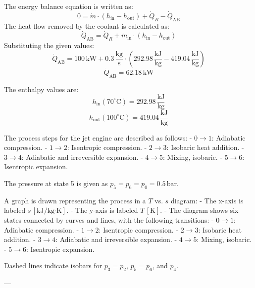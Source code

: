The energy balance equation is written as:  
\[
0 = \dot{m} \cdot (h_{\text{in}} - h_{\text{out}}) + \dot{Q}_R - \dot{Q}_{\text{AB}}
\]  
The heat flow removed by the coolant is calculated as:  
\[
\dot{Q}_{\text{AB}} = \dot{Q}_R + \dot{m}_{\text{in}} \cdot (h_{\text{in}} - h_{\text{out}})
\]  
Substituting the given values:  
\[
\dot{Q}_{\text{AB}} = 100 \, \text{kW} + 0.3 \, \frac{\text{kg}}{\text{s}} \cdot (292.98 \, \frac{\text{kJ}}{\text{kg}} - 419.04 \, \frac{\text{kJ}}{\text{kg}})
\]  
\[
\dot{Q}_{\text{AB}} = 62.18 \, \text{kW}
\]  

The enthalpy values are:  
\[
h_{\text{in}}(70^\circ\text{C}) = 292.98 \, \frac{\text{kJ}}{\text{kg}}
\]  
\[
h_{\text{out}}(100^\circ\text{C}) = 419.04 \, \frac{\text{kJ}}{\text{kg}}
\]

The process steps for the jet engine are described as follows:  
- \( 0 \rightarrow 1 \): Adiabatic compression.  
- \( 1 \rightarrow 2 \): Isentropic compression.  
- \( 2 \rightarrow 3 \): Isobaric heat addition.  
- \( 3 \rightarrow 4 \): Adiabatic and irreversible expansion.  
- \( 4 \rightarrow 5 \): Mixing, isobaric.  
- \( 5 \rightarrow 6 \): Isentropic expansion.  

The pressure at state 5 is given as \( p_5 = p_6 = p_0 = 0.5 \, \text{bar} \).  

A graph is drawn representing the process in a \( T \) vs. \( s \) diagram:  
- The x-axis is labeled \( s \, [\text{kJ/kg·K}] \).  
- The y-axis is labeled \( T \, [\text{K}] \).  
- The diagram shows six states connected by curves and lines, with the following transitions:  
  - \( 0 \rightarrow 1 \): Adiabatic compression.  
  - \( 1 \rightarrow 2 \): Isentropic compression.  
  - \( 2 \rightarrow 3 \): Isobaric heat addition.  
  - \( 3 \rightarrow 4 \): Adiabatic and irreversible expansion.  
  - \( 4 \rightarrow 5 \): Mixing, isobaric.  
  - \( 5 \rightarrow 6 \): Isentropic expansion.  

Dashed lines indicate isobars for \( p_3 = p_2 \), \( p_5 = p_6 \), and \( p_4 \).  

---